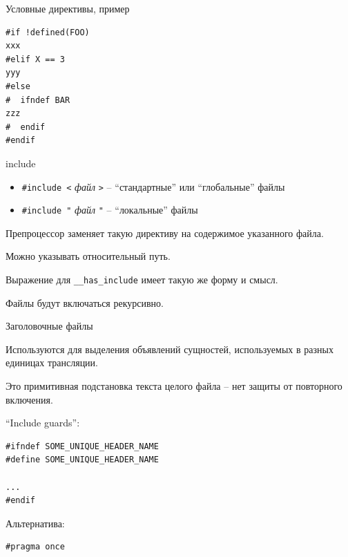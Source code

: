 \documentclass[unknownkeysallowed,xcolor=table]{beamer}
\begin{document}
\begin{frame}[fragile]{Условные директивы, пример}

\begin{lstlisting}
#if !defined(FOO)
xxx
#elif X == 3
yyy
#else
#  ifndef BAR
zzz
#  endif
#endif
\end{lstlisting}

\end{frame}

\begin{frame}[fragile]{include}

\begin{itemize}
  \item \lstinline{#include <} \emph{файл} \lstinline{>} -- ``стандартные'' или ``глобальные'' файлы
  \item \lstinline{#include "} \emph{файл} \lstinline{"} -- ``локальные'' файлы
\end{itemize}

\vspace{2em}

Препроцессор заменяет такую директиву на содержимое указанного файла.

Можно указывать относительный путь.

\vspace{1em}

Выражение для \lstinline{__has_include} имеет такую же форму и смысл.

\vspace{1em}

Файлы будут включаться рекурсивно.

\end{frame}

\begin{frame}[fragile]{Заголовочные файлы}

Используются для выделения объявлений сущностей, используемых в разных единицах трансляции.

\vspace{1em}

Это примитивная подстановка текста целого файла -- нет защиты от повторного включения.

\vspace{1em}

``Include guards'':
\begin{lstlisting}
#ifndef SOME_UNIQUE_HEADER_NAME
#define SOME_UNIQUE_HEADER_NAME

...
#endif
\end{lstlisting}

\vspace{0.5em}

Альтернатива:
\begin{lstlisting}
#pragma once
\end{lstlisting}

\end{frame}
\end{document}
